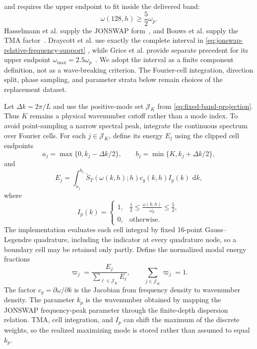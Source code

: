 \documentclass[11pt]{article}
\newcommand{\dd}{\,\mathrm d}
\begin{document}
and requires the upper endpoint to fit inside the delivered band:
\begin{equation}
  \omega(128,h)\geq\frac52\omega_p.
  \label{eq:jonswap-frequency-fit}
\end{equation}
Hasselmann et al. supply the JONSWAP form~\cite{hasselmann1973}, and Bouws et
al. supply the TMA factor~\cite{bouws1985}.  Draycott et al. use exactly the
complete interval in \eqref{eq:jonswap-relative-frequency-support}
\cite{draycott2026}, while Grice et al. provide separate precedent for its
upper endpoint $\omega_{\max}=2.5\omega_p$~\cite{grice2015}.  We adopt the
interval as a finite component definition, not as a wave-breaking criterion.
The Fourier-cell integration, direction split, phase sampling, and parameter
strata below remain choices of the replacement dataset.

Let $\Delta k=2\pi/L$ and use the positive-mode set $\mathcal J_K$ from
\eqref{eq:fixed-band-projection}.  Thus $K$ remains a physical wavenumber
cutoff rather than a mode index.  To
avoid point-sampling a narrow spectral peak, integrate the continuous
spectrum over Fourier cells.  For each $j\in\mathcal J_K$, define its energy
$E_j$ using the clipped cell endpoints
\[
  a_j=\max\{0,k_j-\Delta k/2\},\qquad
  b_j=\min\{K,k_j+\Delta k/2\},
\]
and
\begin{equation}
  E_j=\int_{a_j}^{b_j}
  \widetilde S_T(\omega(k,h);h)c_g(k,h)I_p(k)\,\dd k,
\end{equation}
where
\begin{equation}
  I_p(k)=
  \begin{cases}
    1,&\displaystyle \frac12\leq
       \frac{\omega(k,h)}{\omega_p}\leq\frac52,\\
    0,&\text{otherwise}.
  \end{cases}
  \label{eq:jonswap-relative-frequency-window}
\end{equation}
The implementation evaluates each cell integral by fixed 16-point
Gauss--Legendre quadrature, including the indicator at every quadrature node,
so a boundary cell may be retained only partly.  Define the normalized modal energy fractions
\begin{equation}
  \varpi_j=\frac{E_j}{\sum_{\ell\in\mathcal J_K}E_\ell},
  \qquad
  \sum_{j\in\mathcal J_K}\varpi_j=1.
  \label{eq:jonswap-weights}
\end{equation}
The factor $c_g=\partial\omega/\partial k$ is the Jacobian from frequency
density to wavenumber density.  The parameter $k_p$ is the wavenumber obtained
by mapping the JONSWAP frequency-peak parameter through the finite-depth
dispersion relation.  TMA, cell integration, and $I_p$ can shift the maximum
of the discrete weights, so the realized maximizing mode is stored rather
than assumed to equal $k_p$.
\end{document}

